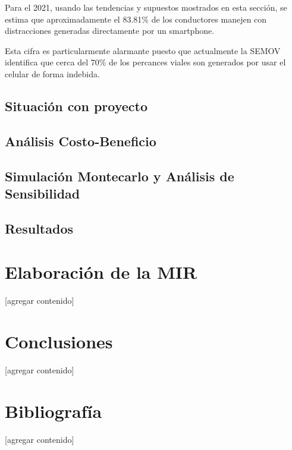 \documentclass{article}
\begin{document}
Para el 2021, usando las tendencias y supuestos mostrados en esta sección, se estima
que aproximadamente el 83.81\% de los conductores manejen con distracciones generadas
directamente por un smartphone.

Esta cifra es particularmente alarmante puesto que actualmente la SEMOV identifica
que cerca del 70\% de los percances viales son generados por usar el celular de
forma indebida.

\subsection{Situación con proyecto}



\subsection{Análisis Costo-Beneficio}
% 
% 

\subsection{Simulación Montecarlo y Análisis de Sensibilidad}

\subsection{Resultados}
% 
% 

\newpage
\section{Elaboración de la MIR}\label{sec:mir}
[agregar contenido]

\newpage
\section{Conclusiones}\label{sec:conclutions}
[agregar contenido]

\newpage
\section{Bibliografía}\label{sec:references}
[agregar contenido]
\end{document}
